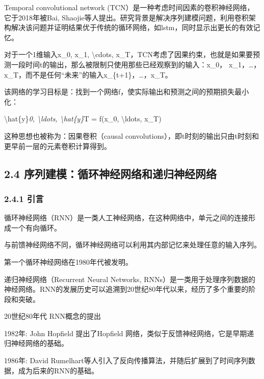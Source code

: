 Temporal convolutional network
(TCN）是一种考虑时间因素的卷积神经网络，它于2018年被Bai,
Shaojie等人提出。研究背景是解决序列建模问题，利用卷积架构解决该问题并证明结果优于传统的循环网络，如lstm，同时显示出更长的有效记忆。

对于一个1维输入x\_0, x\_1, \textbackslash cdots,
x\_T，TCN考虑了因果约束，也就是如果要预测一段时间t的输出，那么被限制只使用那些已经观察到的输入：x\_0，
x\_1，\ldots，x\_T，而不是任何``未来''的输入x\_\{t+1\}，\ldots，x\_T。

该网络的学习目标是：找到一个网络f，使实际输出和预测之间的预期损失最小化：

\textbackslash hat\{y\}\emph{0, \textbackslash ldots,
\textbackslash hat\{y\}}T = f(x\_0, \textbackslash ldots, x\_T)


这种思想也被称为：因果卷积（causal
convolutions），即t时刻的输出只由t时刻和更早前一层的元素卷积计算得到。

\subsection{\texorpdfstring{\textbf{2.4}
\textbf{序列建模：循环神经网络和递归神经网络}}{2.4 序列建模：循环神经网络和递归神经网络}}\label{24-ux5e8fux5217ux5efaux6a21ux5faaux73afux795eux7ecfux7f51ux7edcux548cux9012ux5f52ux795eux7ecfux7f51ux7edc}

\subsubsection{\texorpdfstring{\textbf{2.4.1}
\textbf{引言}}{2.4.1 引言}}\label{241-ux5f15ux8a00}

循环神经网络（RNN）是一类人工神经网络，在这种网络中，单元之间的连接形成一个有向循环。

与前馈神经网络不同，循环神经网络可以利用其内部记忆来处理任意的输入序列。

第一个循环神经网络在1980年代被发明。

递归神经网络（Recurrent Neural Networks,
RNNs）是一类用于处理序列数据的神经网络。RNN的发展历史可以追溯到20世纪80年代以来，经历了多个重要的阶段和突破。

20世纪80年代 RNN概念的提出

1982年: John Hopfield 提出了Hopfield
网络，类似于反馈神经网络，它是早期递归神经网络的基础。

1986年: David
Rumelhart等人引入了反向传播算法，并随后扩展到了时间序列数据，成为后来的RNN的基础。

